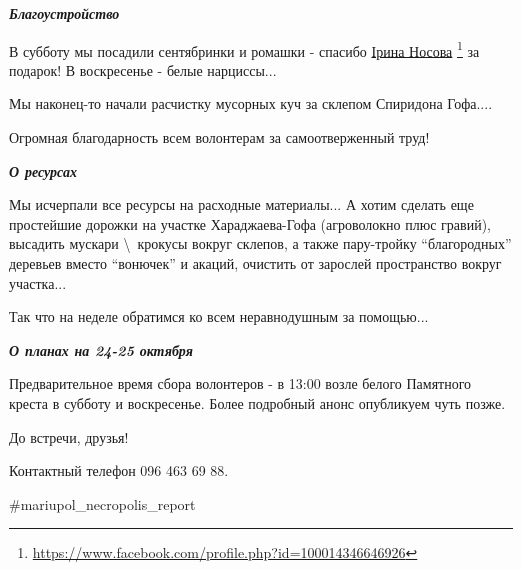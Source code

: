 \emph{\textbf{Благоустройство}}

В субботу мы посадили сентябринки и ромашки - спасибо \href{https://www.facebook.com/profile.php?id=100014346646926}{Ірина Носова}%
\footnote{\url{https://www.facebook.com/profile.php?id=100014346646926}}
за подарок! В воскресенье - белые нарциссы...

Мы наконец-то начали расчистку мусорных куч за склепом Спиридона Гофа....

Огромная благодарность всем волонтерам за самоотверженный труд!

\emph{\textbf{О ресурсах}}

Мы исчерпали все ресурсы на расходные материалы... А хотим сделать еще
простейшие дорожки на участке Хараджаева-Гофа (агроволокно плюс гравий),
высадить мускари \textbackslash\ крокусы вокруг склепов, а также пару-тройку \enquote{благородных}
деревьев вместо \enquote{вонючек} и акаций, очистить от зарослей пространство вокруг
участка...

Так что на неделе обратимся ко всем неравнодушным за помощью...

\emph{\textbf{О планах на 24-25 октября}}

Предварительное время сбора волонтеров - в 13:00 возле белого Памятного креста
в субботу и воскресенье. Более подробный анонс опубликуем чуть позже.

До встречи, друзья!

Контактный телефон 096 463 69 88.

\#mariupol\_necropolis\_report
